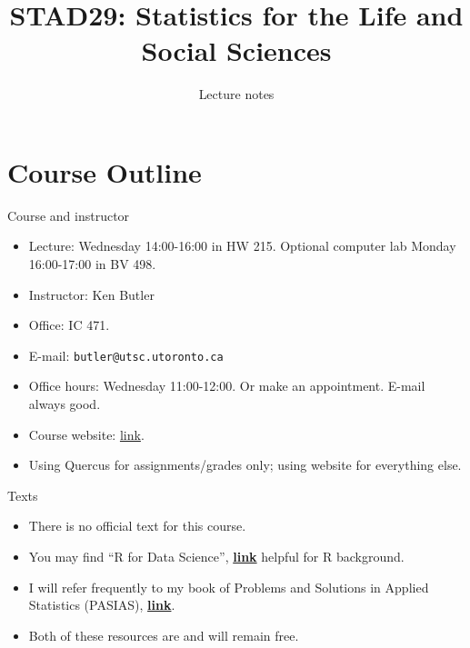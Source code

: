 \documentclass[ignorenonframetext,]{beamer}
\title{STAD29: Statistics for the Life and Social Sciences}
\author{Lecture notes}
\date{}
\begin{document}
\frame{\titlepage}

\hypertarget{course-outline}{%
\section{Course Outline}\label{course-outline}}

\begin{frame}[fragile]{Course and instructor}
\protect\hypertarget{course-and-instructor}{}

\begin{itemize}
\item
  Lecture: Wednesday 14:00-16:00 in HW 215. Optional computer lab Monday
  16:00-17:00 in BV 498.
\item
  Instructor: Ken Butler
\item
  Office: IC 471.
\item
  E-mail: \texttt{butler@utsc.utoronto.ca}
\item
  Office hours: Wednesday 11:00-12:00. Or make an appointment. E-mail
  always good.
\item
  Course website: \href{http://ritsokiguess.site/STAD29/}{link}.
\item
  Using Quercus for assignments/grades only; using website for
  everything else.
\end{itemize}

\end{frame}

\begin{frame}{Texts}
\protect\hypertarget{texts}{}

\begin{itemize}
\item
  There is no official text for this course.
\item
  You may find ``R for Data Science'',
  \href{http://r4ds.had.co.nz/}{\textbf{link}} helpful for R background.
\item
  I will refer frequently to my book of Problems and Solutions in
  Applied Statistics (PASIAS),
  \href{http://ritsokiguess.site/pasias/}{\textbf{link}}.
\item
  Both of these resources are and will remain free.
\end{itemize}

\end{frame}
\end{document}
